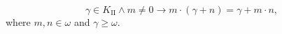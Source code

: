 $$\gamma \in K_{\mathrm{II}} \land m \neq 0 \rightarrow m \cdot (\gamma + n) = \gamma + m \cdot n,$$
where $m, n \in \omega$ and $\gamma \ge \omega$.
